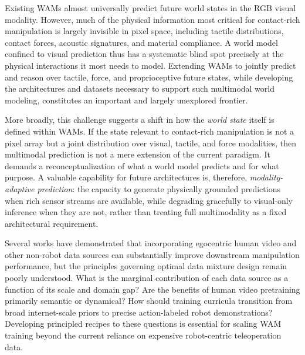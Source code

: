  Existing WAMs almost universally predict future world states in the RGB visual modality. However, much of the physical information most critical for contact-rich manipulation is largely invisible in pixel space, including tactile distributions, contact forces, acoustic signatures, and material compliance. A world model confined to visual prediction thus has a systematic blind spot precisely at the physical interactions it most needs to model. Extending WAMs to jointly predict and reason over tactile, force, and proprioceptive future states, while developing the architectures and datasets necessary to support such multimodal world modeling, constitutes an important and largely unexplored frontier.


More broadly, this challenge suggests a shift in how the
\textit{world state} itself is defined within WAMs.
If the state relevant to contact-rich manipulation is not a pixel array but a joint distribution over visual, tactile, and force modalities, then multimodal prediction is not a mere extension of the current paradigm. It demands a reconceptualization of what a world model predicts and for what purpose. A valuable capability for future architectures is, therefore, \textit{modality-adaptive prediction}: the capacity to generate physically grounded predictions when rich sensor streams are available, while degrading gracefully to visual-only inference when they are not, rather than treating full multimodality as a fixed architectural requirement.



 Several works have demonstrated that incorporating egocentric human video and other non-robot data sources can substantially improve downstream manipulation performance, but the principles governing optimal data mixture design remain poorly understood. What is the marginal contribution of each data source as a function of its scale and domain gap? Are the benefits of human video pretraining primarily semantic or dynamical? How should training curricula transition from broad internet-scale priors to precise action-labeled robot demonstrations? Developing principled recipes to these questions is essential for scaling WAM training beyond the current reliance on expensive robot-centric teleoperation data.


